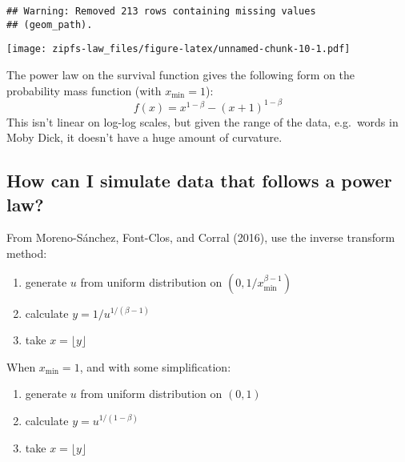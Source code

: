 \documentclass[]{article}
\providecommand{\tightlist}{%
  \setlength{\itemsep}{0pt}\setlength{\parskip}{0pt}}
\begin{document}
\begin{verbatim}
## Warning: Removed 213 rows containing missing values
## (geom_path).
\end{verbatim}

\texttt{[image: zipfs-law\_files/figure-latex/unnamed-chunk-10-1.pdf]}

The power law on the survival function gives the following form on the
probability mass function (with \(x_\text{min} = 1\)): \[
f(x) = x^{1 - \beta} - (x + 1)^{1 - \beta}
\] This isn't linear on log-log scales, but given the range of the data,
e.g.~words in Moby Dick, it doesn't have a huge amount of curvature.

\hypertarget{how-can-i-simulate-data-that-follows-a-power-law}{%
\subsection{How can I simulate data that follows a power
law?}\label{how-can-i-simulate-data-that-follows-a-power-law}}

From Moreno-Sánchez, Font-Clos, and Corral (2016), use the inverse
transform method:

\begin{enumerate}
\def\labelenumi{\arabic{enumi}.}
\tightlist
\item
  generate \(u\) from uniform distribution on
  \((0, 1/x_\text{min}^{\beta - 1})\)
\item
  calculate \(y = 1/u^{1/(\beta - 1)}\)
\item
  take \(x = \lfloor y\rfloor\)
\end{enumerate}

When \(x_\text{min} = 1\), and with some simplification:

\begin{enumerate}
\def\labelenumi{\arabic{enumi}.}
\tightlist
\item
  generate \(u\) from uniform distribution on \((0, 1)\)
\item
  calculate \(y = u^{1/(1 - \beta)}\)
\item
  take \(x = \lfloor y\rfloor\)
\end{enumerate}
\end{document}
